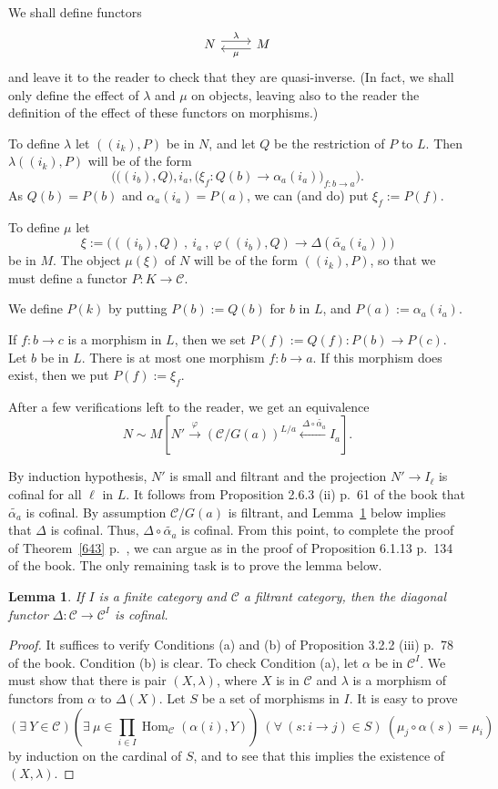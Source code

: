 \documentclass[12pt]{article}%
\newtheorem{lem}[thm]{Lemma}
\theoremstyle{remark}
\theoremstyle{definition}
\newcommand{\C}{\mathcal C}
\newcommand{\pp}{\varphi}
\DeclareMathOperator{\Hom}{Hom}%
\begin{document}
We shall define functors 
$$
\begin{tikzcd}
N\ar[yshift=0.7ex]{r}{\lambda}&M\ar[yshift=-0.7ex]{l}{\mu}
\end{tikzcd}
$$ 
and leave it to the reader to check that they are quasi-inverse. (In fact, we shall only define the effect of $\lambda$ and $\mu$ on objects, leaving also to the reader the definition of the effect of these functors on morphisms.)

To define $\lambda$ let $((i_k),P)$ be in $N$, and let $Q$ be the restriction of $P$ to $L$. Then $\lambda((i_k),P)$ will be of the form 
$$
\Big(\big((i_b),Q\big),i_a,\big(\xi_f:Q(b)\to\alpha_a(i_a)\big)_{f:b\to a}\Big).
$$ 
As $Q(b)=P(b)$ and $\alpha_a(i_a)=P(a)$, we can (and do) put $\xi_f:=P(f)$. 

To define $\mu$ let 
$$
\xi:=\Big(((i_b),Q)\ ,\ i_a\ ,\ \pp((i_b),Q)\to\Delta(\widetilde{\alpha_a}(i_a))\Big)
$$ 
be in $M$. The object $\mu(\xi)$ of $N$ will be of the form $((i_k),P)$, so that we must define a functor $P:K\to\C$. 

We define $P(k)$ by putting $P(b):=Q(b)$ for $b$ in $L$, and $P(a):=\alpha_a(i_a)$. 

If $f:b\to c$ is a morphism in $L$, then we set $P(f):=Q(f):P(b)\to P(c)$. Let $b$ be in $L$. There is at most one morphism $f:b\to a$. If this morphism does exist, then we put $P(f):=\xi_f$. 

After a few verifications left to the reader, we get an equivalence 
$$ 
N\sim M\left[N'\xrightarrow{\pp}(\C/G(a))^{L/a}\xleftarrow{\ \Delta\circ\widetilde{\alpha_a}}I_a\right]. 
$$

By induction hypothesis, $N'$ is small and filtrant and the projection $N'\to I_\ell$ is cofinal for all $\ell$ in $L$. It follows from Proposition 2.6.3 (ii) p.~61 of the book that $\widetilde{\alpha_a}$ is cofinal. By assumption $\C/G(a)$ is filtrant, and Lemma~\ref{delta} below implies that $\Delta$ is cofinal. Thus, $\Delta\circ\widetilde{\alpha_a}$ is cofinal. From this point, to complete the proof of Theorem~\ref{643} p.~\pageref{643}, we can argue as in the proof of Proposition 6.1.13 p.~134 of the book. The only remaining task is to prove the lemma below.

\begin{lem}\label{delta}
If $I$ is a finite category and $\C$ a filtrant category, then the diagonal functor $\Delta:\C\to\C^I$ is cofinal.
\end{lem}
%
\begin{proof}
It suffices to verify Conditions (a) and (b) of Proposition 3.2.2 (iii) p.~78 of the book. Condition (b) is clear. To check Condition (a), let $\alpha$ be in $\C^I$. We must show that there is pair $(X,\lambda)$, where $X$ is in $\C$ and $\lambda$ is a morphism of functors from $\alpha$ to $\Delta(X)$. Let $S$ be a set of morphisms in $I$. It is easy to prove 
$$
(\exists\ Y\in\C)\left(\exists\ \mu\in\prod_{i\in I}\Hom_\C(\alpha(i),Y)\right)\ (\forall\ (s:i\to j)\in S)\ (\mu_{j}\circ\alpha(s)=\mu_i) 
$$ 
by induction on the cardinal of $S$, and to see that this implies the existence of $(X,\lambda)$.
\end{proof}
\end{document}
